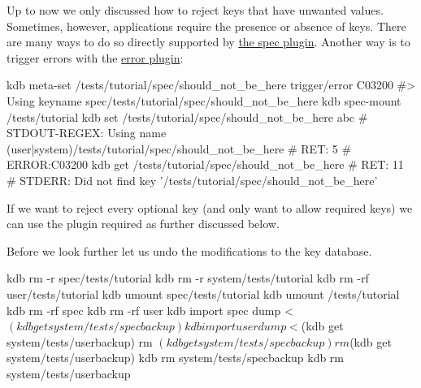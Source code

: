 Up to now we only discussed how to reject keys that have unwanted values. Sometimes, however, applications require the presence or absence of keys. There are many ways to do so directly supported by \hyperlink{autotoc_md645_src_plugins_spec_README_md}{the spec plugin}. Another way is to trigger errors with the \hyperlink{autotoc_md198_src_plugins_error_README_md}{error plugin}\+:


\begin{DoxyCode}
kdb meta-set /tests/tutorial/spec/should\_not\_be\_here trigger/error C03200
#> Using keyname spec/tests/tutorial/spec/should\_not\_be\_here
kdb spec-mount /tests/tutorial
kdb set /tests/tutorial/spec/should\_not\_be\_here abc
# STDOUT-REGEX: Using name (user|system)/tests/tutorial/spec/should\_not\_be\_here
# RET:    5
# ERROR:C03200
kdb get /tests/tutorial/spec/should\_not\_be\_here
# RET: 11
# STDERR: Did not find key '/tests/tutorial/spec/should\_not\_be\_here'
\end{DoxyCode}


If we want to reject every optional key (and only want to allow required keys) we can use the plugin {\ttfamily required} as further discussed below.

Before we look further let us undo the modifications to the key database.


\begin{DoxyCode}
kdb rm -r spec/tests/tutorial
kdb rm -r system/tests/tutorial
kdb rm -rf user/tests/tutorial
kdb umount spec/tests/tutorial
kdb umount /tests/tutorial
kdb rm -rf spec
kdb rm -rf user
kdb import spec dump < $(kdb get system/tests/specbackup)
kdb import user dump < $(kdb get system/tests/userbackup)
rm $(kdb get system/tests/specbackup)
rm $(kdb get system/tests/userbackup)
kdb rm system/tests/specbackup
kdb rm system/tests/userbackup
\end{DoxyCode}
 